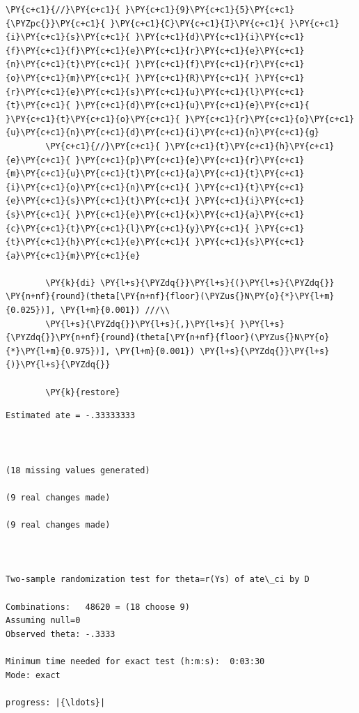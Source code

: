 \documentclass[11pt,notitlepage]{article}\usepackage[]{graphicx}\usepackage[]{color}
\makeatletter
\newenvironment{kframe}{%
 \def\at@end@of@kframe{}%
 \ifinner\ifhmode%
  \def\at@end@of@kframe{\end{minipage}}%
  \begin{minipage}{\columnwidth}%
 \fi\fi%
 \def\FrameCommand##1{\hskip\@totalleftmargin \hskip-\fboxsep
 \colorbox{shadecolor}{##1}\hskip-\fboxsep
     \hskip-\linewidth \hskip-\@totalleftmargin \hskip\columnwidth}%
 \MakeFramed {\advance\hsize-\width
   \@totalleftmargin\z@ \linewidth\hsize
   \@setminipage}}%
 {\par\unskip\endMakeFramed%
 \at@end@of@kframe}
\newenvironment{knitrout}{}{} %
\makeatother
\begin{document}
\begin{enumerate}[a)]
\begin{knitrout}
\begin{kframe}
\begin{Verbatim}[commandchars=\\\{\}]
        \PY{c+c1}{//}\PY{c+c1}{ }\PY{c+c1}{9}\PY{c+c1}{5}\PY{c+c1}{\PYZpc{}}\PY{c+c1}{ }\PY{c+c1}{C}\PY{c+c1}{I}\PY{c+c1}{ }\PY{c+c1}{i}\PY{c+c1}{s}\PY{c+c1}{ }\PY{c+c1}{d}\PY{c+c1}{i}\PY{c+c1}{f}\PY{c+c1}{f}\PY{c+c1}{e}\PY{c+c1}{r}\PY{c+c1}{e}\PY{c+c1}{n}\PY{c+c1}{t}\PY{c+c1}{ }\PY{c+c1}{f}\PY{c+c1}{r}\PY{c+c1}{o}\PY{c+c1}{m}\PY{c+c1}{ }\PY{c+c1}{R}\PY{c+c1}{ }\PY{c+c1}{r}\PY{c+c1}{e}\PY{c+c1}{s}\PY{c+c1}{u}\PY{c+c1}{l}\PY{c+c1}{t}\PY{c+c1}{ }\PY{c+c1}{d}\PY{c+c1}{u}\PY{c+c1}{e}\PY{c+c1}{ }\PY{c+c1}{t}\PY{c+c1}{o}\PY{c+c1}{ }\PY{c+c1}{r}\PY{c+c1}{o}\PY{c+c1}{u}\PY{c+c1}{n}\PY{c+c1}{d}\PY{c+c1}{i}\PY{c+c1}{n}\PY{c+c1}{g}
        \PY{c+c1}{//}\PY{c+c1}{ }\PY{c+c1}{t}\PY{c+c1}{h}\PY{c+c1}{e}\PY{c+c1}{ }\PY{c+c1}{p}\PY{c+c1}{e}\PY{c+c1}{r}\PY{c+c1}{m}\PY{c+c1}{u}\PY{c+c1}{t}\PY{c+c1}{a}\PY{c+c1}{t}\PY{c+c1}{i}\PY{c+c1}{o}\PY{c+c1}{n}\PY{c+c1}{ }\PY{c+c1}{t}\PY{c+c1}{e}\PY{c+c1}{s}\PY{c+c1}{t}\PY{c+c1}{ }\PY{c+c1}{i}\PY{c+c1}{s}\PY{c+c1}{ }\PY{c+c1}{e}\PY{c+c1}{x}\PY{c+c1}{a}\PY{c+c1}{c}\PY{c+c1}{t}\PY{c+c1}{l}\PY{c+c1}{y}\PY{c+c1}{ }\PY{c+c1}{t}\PY{c+c1}{h}\PY{c+c1}{e}\PY{c+c1}{ }\PY{c+c1}{s}\PY{c+c1}{a}\PY{c+c1}{m}\PY{c+c1}{e}
        
        \PY{k}{di} \PY{l+s}{\PYZdq{}}\PY{l+s}{(}\PY{l+s}{\PYZdq{}} \PY{n+nf}{round}(theta[\PY{n+nf}{floor}(\PYZus{}N\PY{o}{*}\PY{l+m}{0.025})], \PY{l+m}{0.001}) ///\\
        \PY{l+s}{\PYZdq{}}\PY{l+s}{,}\PY{l+s}{ }\PY{l+s}{\PYZdq{}}\PY{n+nf}{round}(theta[\PY{n+nf}{floor}(\PYZus{}N\PY{o}{*}\PY{l+m}{0.975})], \PY{l+m}{0.001}) \PY{l+s}{\PYZdq{}}\PY{l+s}{)}\PY{l+s}{\PYZdq{}}
        
        \PY{k}{restore}
\end{Verbatim}

    \begin{Verbatim}[commandchars=\\\{\}]
Estimated ate = -.33333333



(18 missing values generated)

(9 real changes made)

(9 real changes made)



Two-sample randomization test for theta=r(Ys) of ate\_ci by D

Combinations:   48620 = (18 choose 9)
Assuming null=0
Observed theta: -.3333

Minimum time needed for exact test (h:m:s):  0:03:30
Mode: exact

progress: |{\ldots}|


\end{Verbatim}
\end{kframe}
\end{knitrout}
\end{enumerate}
\end{document}
